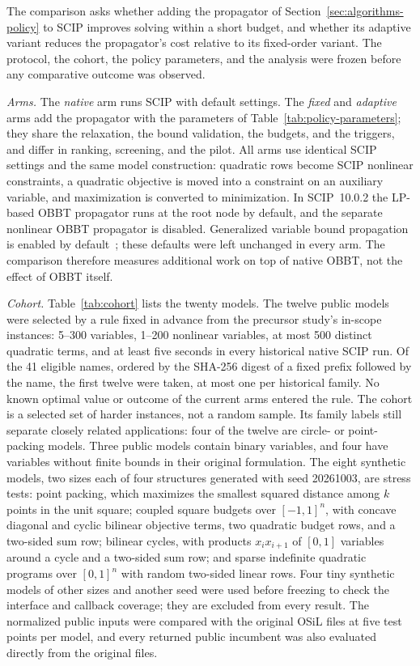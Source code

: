 The comparison asks whether adding the propagator of
Section~\ref{sec:algorithms-policy} to SCIP improves solving within a short
budget, and whether its adaptive variant reduces the propagator's cost
relative to its fixed-order variant. The protocol, the cohort, the policy
parameters, and the analysis were frozen before any comparative outcome was
observed.

\emph{Arms.} The \emph{native} arm runs SCIP with default settings. The
\emph{fixed} and \emph{adaptive} arms add the propagator with the parameters of
Table~\ref{tab:policy-parameters}; they share the relaxation, the bound
validation, the budgets, and the triggers, and differ in ranking, screening,
and the pilot. All arms use identical SCIP settings and the same model
construction: quadratic rows become SCIP nonlinear constraints, a quadratic
objective is moved into a constraint on an auxiliary variable, and maximization
is converted to minimization. In SCIP~10.0.2 the LP-based OBBT propagator runs at
the root node by default, and the separate nonlinear OBBT propagator is
disabled. Generalized variable bound propagation is enabled by
default~\cite{scip1002-obbt,scip1002-nlobbt,scip1002-genvbounds}; these defaults
were left unchanged in every arm. The comparison
therefore measures additional work on top of native OBBT, not the effect of
OBBT itself.

\emph{Cohort.} Table~\ref{tab:cohort} lists the twenty models. The twelve
public models were selected by a rule fixed in advance from the precursor
study's in-scope instances: 5--300 variables, 1--200 nonlinear variables, at
most 500 distinct quadratic terms, and at least five seconds in every
historical native SCIP run. Of the 41 eligible names, ordered by the SHA-256
digest of a fixed prefix followed by the name, the first twelve were taken, at
most one per historical family. No known optimal value or outcome of the
current arms entered the rule. The cohort is a selected set of harder
instances, not a random sample. Its family labels still separate closely
related applications: four of the twelve are circle- or point-packing models.
Three public models contain binary variables, and four have variables without
finite bounds in their original formulation. The eight synthetic models, two
sizes each of four structures generated with seed 20261003, are stress tests:
point packing, which maximizes the smallest squared distance among $k$ points
in the unit square; coupled square budgets over $[-1,1]^n$, with concave
diagonal and cyclic bilinear objective terms, two quadratic budget rows, and a
two-sided sum row; bilinear cycles, with products $x_ix_{i+1}$ of $[0,1]$
variables around a cycle and a two-sided sum row; and sparse indefinite
quadratic programs over $[0,1]^n$ with random two-sided linear rows. Four tiny
synthetic models of other sizes and another seed were used before freezing to
check the interface and callback coverage; they are excluded from every result.
The normalized public inputs were compared with the original OSiL files at five
test points per model, and every returned public incumbent was also evaluated
directly from the original files.

